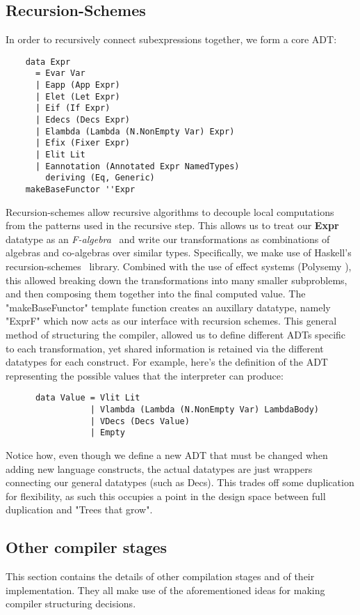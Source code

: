 \documentclass{article} %
\begin{document}
    \subsection{Recursion-Schemes}\label{recursion-schemes}
        In order to recursively connect subexpressions together, we form a core ADT:
    \begin{verbatim}
    data Expr
      = Evar Var
      | Eapp (App Expr)
      | Elet (Let Expr)
      | Eif (If Expr)
      | Edecs (Decs Expr)
      | Elambda (Lambda (N.NonEmpty Var) Expr)
      | Efix (Fixer Expr)
      | Elit Lit
      | Eannotation (Annotated Expr NamedTypes)
        deriving (Eq, Generic)
    makeBaseFunctor ''Expr
    \end{verbatim}
        Recursion-schemes \cite{Meijer1991} allow recursive algorithms to decouple local computations from the patterns used in the recursive step.
        This allows us to treat our \textbf{Expr} datatype as an \textit{F-algebra}~\cite{falgebra} and write our transformations as combinations of algebras and co-algebras over similar types.
        Specifically, we make use of Haskell's recursion-schemes~\cite{kmett} library.
        Combined with the use of effect systems (Polysemy \cite{polysemy}), this allowed breaking down the transformations into many smaller subproblems, and then composing them together into the final computed value.
        The "makeBaseFunctor" template function creates an auxillary datatype, namely "ExprF" which now acts as our interface with recursion schemes.
        This general method of structuring the compiler, allowed us to define different ADTs specific to each transformation, yet shared information is retained via the different datatypes for each construct.
        For example, here's the definition of the ADT representing the possible values that the interpreter can produce:
    \begin{verbatim}
      data Value = Vlit Lit
                 | Vlambda (Lambda (N.NonEmpty Var) LambdaBody)
                 | VDecs (Decs Value)
                 | Empty
    \end{verbatim}
        Notice how, even though we define a new ADT that must be changed when adding new language constructs, the actual datatypes are just wrappers connecting our general datatypes (such as Decs).
        This trades off some duplication for flexibility, as such this occupies a point in the design space between full duplication and "Trees that grow".
\subsection{Other compiler stages}\label{compiler-stages}
    This section contains the details of other compilation stages and of their implementation. They all make use of the aforementioned ideas for making compiler structuring decisions.
\end{document}
